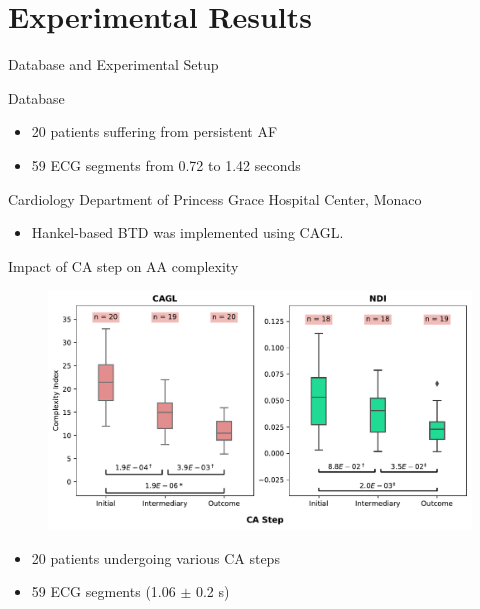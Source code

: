 \documentclass{beamer}
\begin{document}
\section{Experimental Results}

	\begin{frame}{Database and Experimental Setup} 
			
		\begin{block}{Database}
			\begin{itemize}
				\item 20 patients suffering from persistent AF
				\item 59 ECG segments from 0.72 to 1.42 seconds
			\end{itemize}
			
			\begin{center}
				Cardiology Department of Princess Grace Hospital Center, Monaco
			\end{center}					
		\end{block}	
		
		\begin{itemize}
			\item Hankel-based BTD was implemented using CAGL.
		\end{itemize}
	\end{frame}

	\begin{frame}{Impact of CA step on AA complexity}
		
		\vspace{-0.5cm}
		\begin{figure}[h]
			\centering
			\includegraphics[scale=0.5]{figures/boxplot.pdf}
		\end{figure}
		\vspace{-0.5cm}
		\begin{itemize}
			\item 20 patients undergoing various CA steps
			\item 59 ECG segments (1.06 $\pm$ 0.2 s)
		\end{itemize}
	\end{frame}
\end{document}
